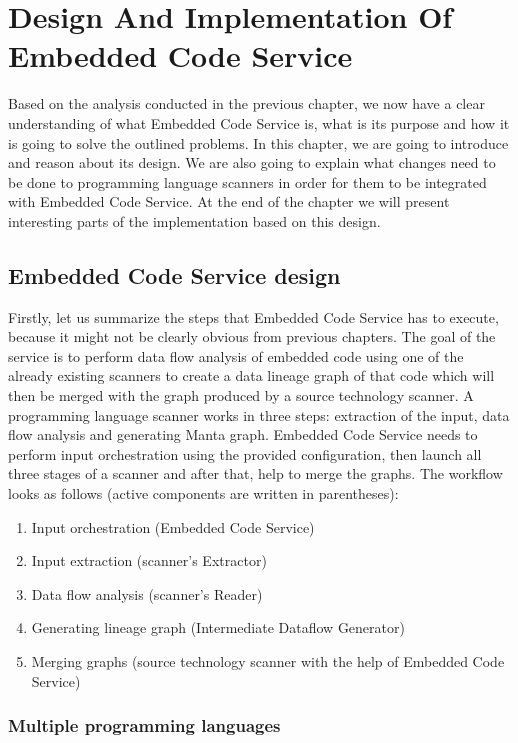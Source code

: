 \chapter{Design And Implementation Of Embedded Code Service}

Based on the analysis conducted in the previous chapter, we now have a clear understanding of what Embedded Code Service is, what is its purpose and how it is going to solve the outlined problems. In this chapter, we are going to introduce and reason about its design. We are also going to explain what changes need to be done to programming language scanners in order for them to be integrated with Embedded Code Service. At the end of the chapter we will present interesting parts of the implementation based on this design.

\section{Embedded Code Service design}

Firstly, let us summarize the steps that Embedded Code Service has to execute, because it might not be clearly obvious from previous chapters. The goal of the service is to perform data flow analysis of embedded code using one of the already existing scanners to create a data lineage graph of that code which will then be merged with the graph produced by a source technology scanner. A programming language scanner works in three steps: extraction of the input, data flow analysis and generating Manta graph. Embedded Code Service needs to perform input orchestration using the provided configuration, then launch all three stages of a scanner and after that, help to merge the graphs. The workflow looks as follows (active components are written in parentheses):
\begin{enumerate}
    \item Input orchestration (Embedded Code Service)
    \item Input extraction (scanner's Extractor)
    \item Data flow analysis (scanner's Reader)
    \item Generating lineage graph (Intermediate Dataflow Generator)
    \item Merging graphs (source technology scanner with the help of Embedded Code Service)
\end{enumerate}

\subsection{Multiple programming languages}

